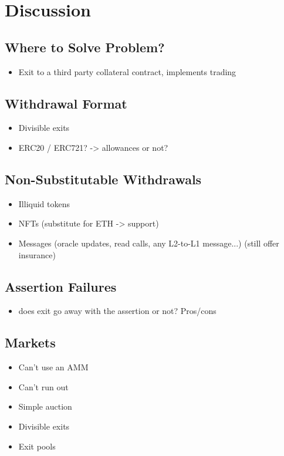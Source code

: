 
\section{Discussion}

\subsection{Where to Solve Problem? }
\begin{itemize}
\item Exit to a third party collateral contract, implements trading
\end{itemize}

\subsection{Withdrawal Format }
\begin{itemize}
\item Divisible exits
\item ERC20 / ERC721? -> allowances or not? 
\end{itemize}

\subsection{Non-Substitutable Withdrawals}

\begin{itemize}
\item Illiquid tokens 
\item NFTs (substitute for ETH -> support)
\item Messages (oracle updates, read calls, any L2-to-L1 message...) (still offer insurance)
\end{itemize}

\subsection{Assertion Failures}

\begin{itemize}
\item does exit go away with the assertion or not? Pros/cons
\end{itemize}

\subsection{Markets}

\begin{itemize}
\item Can't use an AMM 
\item Can't run out
\item Simple auction
\item Divisible exits
\item Exit pools
\end{itemize}



